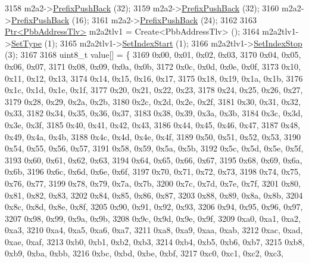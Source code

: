 \begin{DoxyCode}
3158     m2a2->\hyperlink{classns3_1_1PbbAddressBlock_a8e6f539ccffd043a2890396d882d0a42}{PrefixPushBack} (32);
3159     m2a2->\hyperlink{classns3_1_1PbbAddressBlock_a8e6f539ccffd043a2890396d882d0a42}{PrefixPushBack} (32);
3160     m2a2->\hyperlink{classns3_1_1PbbAddressBlock_a8e6f539ccffd043a2890396d882d0a42}{PrefixPushBack} (16);
3161     m2a2->\hyperlink{classns3_1_1PbbAddressBlock_a8e6f539ccffd043a2890396d882d0a42}{PrefixPushBack} (24);
3162 
3163     \hyperlink{classns3_1_1Ptr}{Ptr<PbbAddressTlv>} m2a2tlv1 = Create<PbbAddressTlv> ();
3164     m2a2tlv1->\hyperlink{classns3_1_1PbbTlv_a90a0452018ed364ac37c3ad116dd718b}{SetType} (1);
3165     m2a2tlv1->\hyperlink{classns3_1_1PbbAddressTlv_a82d685ae4e4e2f6d2532cb212f5b2797}{SetIndexStart} (1);
3166     m2a2tlv1->\hyperlink{classns3_1_1PbbAddressTlv_af37ebd0d99b8b894fee7cca449d7adb9}{SetIndexStop} (3);
3167 
3168     uint8\_t value[] = \{
3169       0x00, 0x01, 0x02, 0x03,
3170       0x04, 0x05, 0x06, 0x07,
3171       0x08, 0x09, 0x0a, 0x0b,
3172       0x0c, 0x0d, 0x0e, 0x0f,
3173       0x10, 0x11, 0x12, 0x13,
3174       0x14, 0x15, 0x16, 0x17,
3175       0x18, 0x19, 0x1a, 0x1b,
3176       0x1c, 0x1d, 0x1e, 0x1f,
3177       0x20, 0x21, 0x22, 0x23,
3178       0x24, 0x25, 0x26, 0x27,
3179       0x28, 0x29, 0x2a, 0x2b,
3180       0x2c, 0x2d, 0x2e, 0x2f,
3181       0x30, 0x31, 0x32, 0x33,
3182       0x34, 0x35, 0x36, 0x37,
3183       0x38, 0x39, 0x3a, 0x3b,
3184       0x3c, 0x3d, 0x3e, 0x3f,
3185       0x40, 0x41, 0x42, 0x43,
3186       0x44, 0x45, 0x46, 0x47,
3187       0x48, 0x49, 0x4a, 0x4b,
3188       0x4c, 0x4d, 0x4e, 0x4f,
3189       0x50, 0x51, 0x52, 0x53,
3190       0x54, 0x55, 0x56, 0x57,
3191       0x58, 0x59, 0x5a, 0x5b,
3192       0x5c, 0x5d, 0x5e, 0x5f,
3193       0x60, 0x61, 0x62, 0x63,
3194       0x64, 0x65, 0x66, 0x67,
3195       0x68, 0x69, 0x6a, 0x6b,
3196       0x6c, 0x6d, 0x6e, 0x6f,
3197       0x70, 0x71, 0x72, 0x73,
3198       0x74, 0x75, 0x76, 0x77,
3199       0x78, 0x79, 0x7a, 0x7b,
3200       0x7c, 0x7d, 0x7e, 0x7f,
3201       0x80, 0x81, 0x82, 0x83,
3202       0x84, 0x85, 0x86, 0x87,
3203       0x88, 0x89, 0x8a, 0x8b,
3204       0x8c, 0x8d, 0x8e, 0x8f,
3205       0x90, 0x91, 0x92, 0x93,
3206       0x94, 0x95, 0x96, 0x97,
3207       0x98, 0x99, 0x9a, 0x9b,
3208       0x9c, 0x9d, 0x9e, 0x9f,
3209       0xa0, 0xa1, 0xa2, 0xa3,
3210       0xa4, 0xa5, 0xa6, 0xa7,
3211       0xa8, 0xa9, 0xaa, 0xab,
3212       0xac, 0xad, 0xae, 0xaf,
3213       0xb0, 0xb1, 0xb2, 0xb3,
3214       0xb4, 0xb5, 0xb6, 0xb7,
3215       0xb8, 0xb9, 0xba, 0xbb,
3216       0xbc, 0xbd, 0xbe, 0xbf,
3217       0xc0, 0xc1, 0xc2, 0xc3,

\end{DoxyCode}
